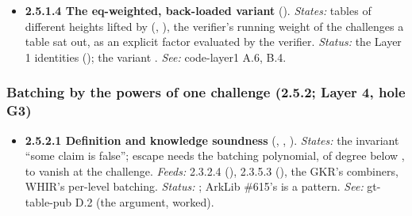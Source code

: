\begin{itemize}[label={}, leftmargin=1.3em, itemindent=-1.3em, labelwidth=0pt, labelsep=0pt, itemsep=4pt, topsep=3pt]
\begin{itemize}[label={}, leftmargin=1.3em, itemindent=-1.3em, labelwidth=0pt, labelsep=0pt, itemsep=4pt, topsep=3pt]
\item {}\label{obl:node-2.5.1.3.2}\textbf{2.5.1.3.2 The uniform sampler's counting bound} (2.3.3.3.3).
\item {}\label{obl:node-2.5.1.3.3}\oblflag\textbf{2.5.1.3.3 The round identity as derivation} (the wire drops one coefficient; the verifier derives it from the running claim). \emph{States:} the dropped-coefficient encoding is inverted by the running claim, so a protocol that sends all coefficients and checks the identity accepts the same transcripts as one that derives; Fiat–Shamir absorbs different data, so a transport lemma is owed. \emph{Status:}  . \emph{See:} gt-table-pub finding ``the round message'' (); gt-bus B (check 15 of \cref{tab:gen-bus-checks}).
\end{itemize}
\item {}\label{obl:node-2.5.1.4}\textbf{2.5.1.4 The eq-weighted, back-loaded variant} (). \emph{States:} tables of different heights lifted by  (, ), the verifier's running weight  of the challenges a table sat out,  as an explicit factor evaluated by the verifier. \emph{Status:} the Layer 1 identities  (); the variant . \emph{See:} code-layer1 A.6, B.4.
\end{itemize}

\subsubsection{Batching by the powers of one challenge (2.5.2; Layer 4, hole G3)}\label{sec:obl-gen-batching}

\begin{itemize}[label={}, leftmargin=1.3em, itemindent=-1.3em, labelwidth=0pt, labelsep=0pt, itemsep=4pt, topsep=3pt]
\item {}\label{obl:node-2.5.2.1}\textbf{2.5.2.1 Definition and knowledge soundness} (, , ). \emph{States:} the invariant ``some claim is false''; escape needs the batching polynomial, of degree below , to vanish at the challenge. \emph{Feeds:} 2.3.2.4 (), 2.3.5.3 (), the GKR's combiners, WHIR's per-level batching. \emph{Status:} ; ArkLib \#615's  is a pattern. \emph{See:} gt-table-pub D.2 (the argument, worked).
\end{itemize}

